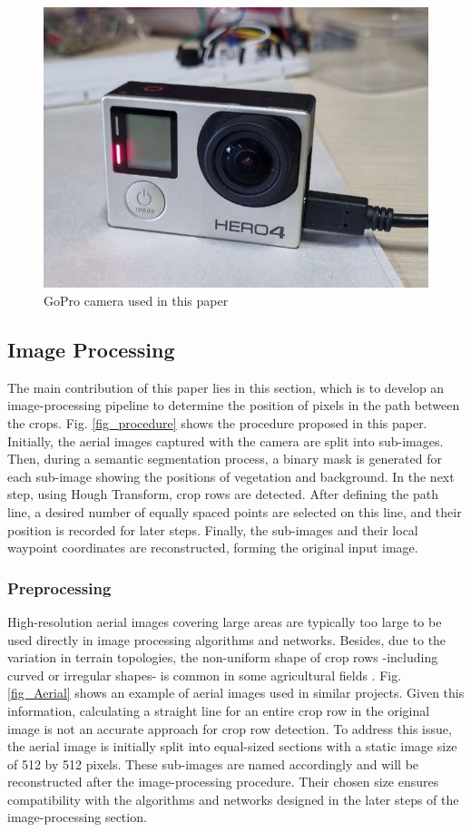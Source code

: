 \documentclass[conference]{IEEEtran}
\begin{document}
	
	\begin{figure}[t]
		\centering
		\includegraphics[width=0.7\linewidth]{GoPro.jpg}
		\caption{GoPro camera used in this paper}
		\label{gopro}
	\end{figure}
	
	
	\subsection{Image Processing}\label{Image Processing}
	The main contribution of this paper lies in this section, which is to develop an image-processing pipeline to determine the position of pixels in the path between the crops. Fig.
	\ref{fig_procedure}
	shows the procedure proposed in this paper. Initially, the aerial images captured with the camera are split into sub-images. Then, during a semantic segmentation process, a binary mask is generated for each sub-image showing the positions of vegetation and background. In the next step, using Hough Transform, crop rows are detected. After defining the path line, a desired number of equally spaced points are selected on this line, and their position is recorded for later steps. Finally, the sub-images and their local waypoint coordinates are reconstructed, forming the original input image.
	
	\subsubsection{Preprocessing}\label{Preprocessing}\leavevmode
	
	High-resolution aerial images covering large areas are typically too large to be used directly in image processing algorithms and networks.
	Besides, due to the variation in terrain topologies, the non-uniform shape of crop rows -including curved or irregular shapes- is common in some agricultural fields
	\cite{b2, b3, b14}.
	Fig. \ref{fig_Aerial} shows an example of aerial images used in similar projects.
	Given this information, calculating a straight line for an entire crop row in the original image is not an accurate approach for crop row detection.
	To address this issue, the aerial image is initially split into equal-sized sections with a static image size of 512 by 512 pixels. These sub-images are named accordingly and will be reconstructed after the image-processing procedure. Their chosen size ensures compatibility with the algorithms and networks designed in the later steps of the image-processing section.
	
\end{document}
